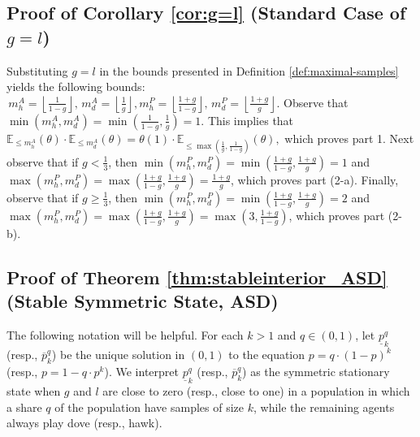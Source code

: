 \documentclass[12pt]{article}
\numberwithin{equation}{section}
\numberwithin{figure}{section}
\theoremstyle{definition}
\theoremstyle{plain}
\theoremstyle{plain}
\theoremstyle{plain}
\theoremstyle{remark}
\theoremstyle{plain}
\theoremstyle{plain}
\begin{document}
\subsection{Proof of Corollary \ref{cor:g=l}\label{proof-cor-g=l} (Standard Case of $g=l$)}
Substituting $g=l$ in  the bounds presented in Definition \ref{def:maximal-samples} yields the following bounds: 
 $\,m_{h}^{A}=\left\lfloor \frac{1}{1-g}\right\rfloor ,\,m_{d}^{A}=\left\lfloor \frac{1}{g}\right\rfloor,
 m_{h}^{P}=\left\lfloor \frac{1+g}{1-g}\right\rfloor ,\,m_{d}^{P}=\left\lfloor \frac{1+g}{g}\right\rfloor.$
 Observe that $\min(m_{h}^{A},m_{d}^{A})=\min( \frac{1}{1-g}, \frac{1}{g})=1$. This implies that  
 $\mathbb{E}_{\leq m_{h}^A}\left(\theta\right)\cdot \mathbb{E}_{\leq m_{d}^A}\left(\theta\right)=\theta(1)\cdot\mathbb{E}_{\leq \max\left(\frac{1}{g},\frac{1}{1-g}\right)}\left(\theta\right),$ which proves part 1.
 Next observe that if $g<\frac{1}{3}$, then  $\min(m_{h}^{P},m_{d}^{P})=\min(\frac{1+g}{1-g},\frac{1+g}{g})=1$ and $\max(m_{h}^{P},m_{d}^{P})=\max(\frac{1+g}{1-g},\frac{1+g}{g})=\frac{1+g}{g}$, which proves part (2-a). Finally, observe that if $g\geq\frac{1}{3}$, then 
 $\min(m_{h}^{P},m_{d}^{P})=\min(\frac{1+g}{1-g},\frac{1+g}{g})=2$ and $\max(m_{h}^{P},m_{d}^{P})=\max(\frac{1+g}{1-g},\frac{1+g}{g})=\max(3,\frac{1+g}{1-g})$, which proves part (2-b).

\subsection{Proof of Theorem \ref{thm:stableinterior_ASD} (Stable Symmetric State, ASD)}\label{subsec:stableinterior_ASDproof}
The following notation will be helpful. For each $k>1$ and $q\in(0,1)$, let $\underline{p}_k^q$ (resp., $\overline{p}_k^q$) be the unique solution in $(0,1)$ to the equation $p=q\cdot(1-p)^k$ (resp., $p=1-q\cdot p^k$). We interpret $\underline{p}_k^q$ (resp., $\overline{p}_k^q$) as the symmetric stationary state when $g$ and $l$ are close to zero (resp., close to one) in a population in which a share $q$ of the population have samples of size $k$, while the remaining agents always play dove (resp., hawk).
\end{document}
